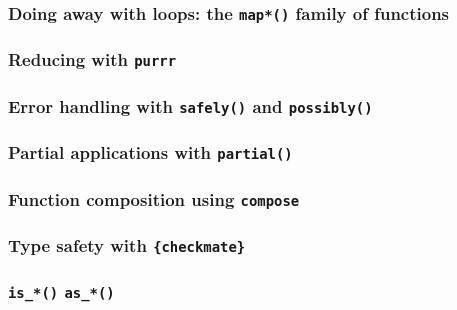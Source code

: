 \documentclass[]{gitbook}
\begin{document}
\hypertarget{doing-away-with-loops-the-map-family-of-functions}{%
\subsubsection{\texorpdfstring{Doing away with loops: the \texttt{map*()} family of functions}{Doing away with loops: the map*() family of functions}}\label{doing-away-with-loops-the-map-family-of-functions}}

\hypertarget{reducing-with-purrr}{%
\subsubsection{\texorpdfstring{Reducing with \texttt{purrr}}{Reducing with purrr}}\label{reducing-with-purrr}}

\hypertarget{error-handling-with-safely-and-possibly}{%
\subsubsection{\texorpdfstring{Error handling with \texttt{safely()} and \texttt{possibly()}}{Error handling with safely() and possibly()}}\label{error-handling-with-safely-and-possibly}}

\hypertarget{partial-applications-with-partial}{%
\subsubsection{\texorpdfstring{Partial applications with \texttt{partial()}}{Partial applications with partial()}}\label{partial-applications-with-partial}}

\hypertarget{function-composition-using-compose}{%
\subsubsection{\texorpdfstring{Function composition using \texttt{compose}}{Function composition using compose}}\label{function-composition-using-compose}}

\hypertarget{type-safety-with-checkmate}{%
\subsubsection{\texorpdfstring{Type safety with \texttt{\{checkmate\}}}{Type safety with \{checkmate\}}}\label{type-safety-with-checkmate}}

\hypertarget{is_-as_}{%
\subsubsection{\texorpdfstring{\texttt{is\_*()} \texttt{as\_*()}}{is\_*() as\_*()}}\label{is_-as_}}
\end{document}

